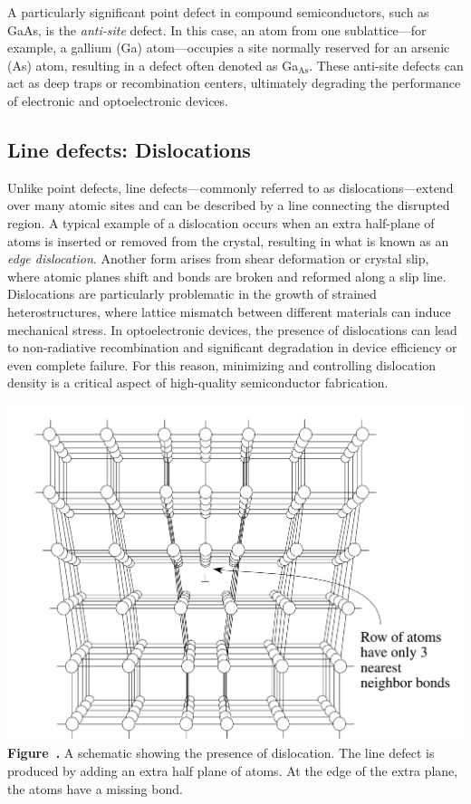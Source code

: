 A particularly significant point defect in compound semiconductors, such as GaAs, is the \textit{anti-site} defect. In this case, an atom from one sublattice—for example, a gallium (Ga) atom—occupies a site normally reserved for an arsenic (As) atom, resulting in a defect often denoted as Ga$_\text{As}$. These anti-site defects can act as deep traps or recombination centers, ultimately degrading the performance of electronic and optoelectronic devices.

\subsection{Line defects: Dislocations}
Unlike point defects, line defects—commonly referred to as dislocations—extend over many atomic sites and can be described by a line connecting the disrupted region. A typical example of a dislocation occurs when an extra half-plane of atoms is inserted or removed from the crystal, resulting in what is known as an \textit{edge dislocation}. Another form arises from shear deformation or crystal slip, where atomic planes shift and bonds are broken and reformed along a slip line.
Dislocations are particularly problematic in the growth of strained heterostructures, where lattice mismatch between different materials can induce mechanical stress. In optoelectronic devices, the presence of dislocations can lead to non-radiative recombination and significant degradation in device efficiency or even complete failure. For this reason, minimizing and controlling dislocation density is a critical aspect of high-quality semiconductor fabrication.
\begin{center}
	\begin{minipage}{0.6\textwidth}
		\centering
		\includegraphics[width=\textwidth]{img/line_defects.png}
		\\[0.5em]
		\textbf{Figure~\thefigure.} A schematic showing the presence of dislocation. The line defect is produced by adding an extra half plane of atoms. At the edge of the extra plane, the atoms have a missing bond.
	\end{minipage}
\end{center}


